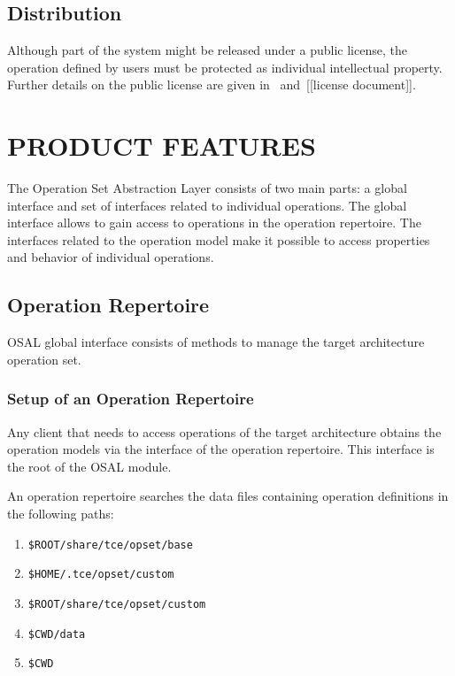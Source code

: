 \documentclass[twoside]{tce}
\begin{document}
\section{Distribution}

Although part of the system might be released under a public license, the
operation defined by users must be protected as individual intellectual
property.  Further details on the public license are given
in~\cite{ProjectPlan} and~[[license document]].



\chapter{PRODUCT FEATURES}

The Operation Set Abstraction Layer consists of two main parts: a global
interface and set of interfaces related to individual operations.  The
global interface allows to gain access to operations in the operation
repertoire.  The interfaces related to the operation model make it possible
to access properties and behavior of individual operations.

\section{Operation Repertoire}
\label{sec:opset-if}

OSAL global interface consists of methods to manage the target architecture
operation set.

\subsection{Setup of an Operation Repertoire}
\label{ssec:opset-paths}

Any client that needs to access operations of the target architecture
obtains the operation models via the interface of the operation repertoire.
This interface is the root of the OSAL module.

An operation repertoire searches the data files containing operation
definitions in the following paths:
\begin{enumerate}
\item %
  \verb|$ROOT/share/tce/opset/base|
\item %
  \verb|$HOME/.tce/opset/custom|
\item %
  \verb|$ROOT/share/tce/opset/custom|
\item %
  \verb|$CWD/data|
\item %
  \verb|$CWD|
\end{enumerate}
\end{document}
